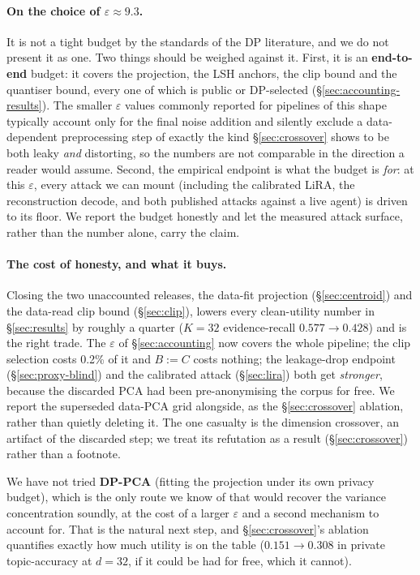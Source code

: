 \documentclass[pdflatex,sn-mathphys-num,iicol]{sn-jnl}
\theoremstyle{thmstyleone}%
\theoremstyle{thmstyletwo}%
\theoremstyle{thmstylethree}%
\newcommand{\eps}{\varepsilon}
\newcommand{\secref}[1]{\S\ref{#1}}
\begin{document}
\paragraph{On the choice of $\eps \approx 9.3$.} It is not a tight budget by the standards of the
DP literature, and we do not present it as one. Two things should be weighed against it. First, it is
an \textbf{end-to-end} budget: it covers the projection, the LSH anchors, the clip bound and the
quantiser bound, every one of which is public or DP-selected (\secref{sec:accounting-results}). The
smaller $\eps$ values commonly reported for pipelines of this shape typically account only for the
final noise addition and silently exclude a data-dependent preprocessing step of exactly the kind
\secref{sec:crossover} shows to be both leaky \emph{and} distorting, so the numbers are not
comparable in the direction a reader would assume. Second, the empirical endpoint is what the budget
is \emph{for}: at this $\eps$, every attack we can mount (including the calibrated LiRA, the
reconstruction decode, and both published attacks against a live agent) is driven to its floor. We
report the budget honestly and let the measured attack surface, rather than the number alone, carry
the claim.

\paragraph{The cost of honesty, and what it buys.} Closing the two unaccounted releases, the
data-fit projection (\secref{sec:centroid}) and the data-read clip bound (\secref{sec:clip}),
lowers every clean-utility number in \secref{sec:results} by roughly a quarter ($K = 32$
evidence-recall $0.577 \to 0.428$) and is the right trade. The $\eps$ of \secref{sec:accounting} now
covers the whole pipeline; the clip selection costs 0.2\% of it and $B := C$ costs nothing; the
leakage-drop endpoint (\secref{sec:proxy-blind}) and the calibrated attack (\secref{sec:lira}) both
get \emph{stronger}, because the discarded PCA had been pre-anonymising the corpus for free. We report
the superseded data-PCA grid alongside, as the \secref{sec:crossover} ablation, rather than quietly
deleting it. The one casualty is the dimension crossover, an artifact of the discarded step; we treat
its refutation as a result (\secref{sec:crossover}) rather than a footnote.

We have not tried \textbf{DP-PCA} (fitting the projection under its own privacy budget), which is
the only route we know of that would recover the variance concentration soundly, at the cost of a
larger $\eps$ and a second mechanism to account for. That is the natural next step, and
\secref{sec:crossover}'s ablation quantifies exactly how much utility is on the table
($0.151 \to 0.308$ in private topic-accuracy at $d = 32$, if it could be had for free, which it
cannot).
\end{document}
